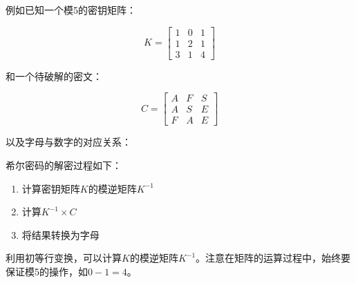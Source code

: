 例如已知一个模5的密钥矩阵：

\[
    K =
    \begin{bmatrix}
        1 & 0 & 1 \\
        1 & 2 & 1 \\
        3 & 1 & 4
    \end{bmatrix}
\]

\vspace{0.5cm}

和一个待破解的密文：

\[
    C =
    \begin{bmatrix}
        A & F & S \\
        A & S & E \\
        F & A & E
    \end{bmatrix}
\]

\vspace{0.5cm}

以及字母与数字的对应关系：\\

\begin{table}[H]
    \centering
\end{table}

希尔密码的解密过程如下：

\begin{enumerate}
    \item 计算密钥矩阵$ K $的模逆矩阵$ K^{-1} $
    \item 计算$ K^{-1} \times C $
    \item 将结果转换为字母
\end{enumerate}

利用初等行变换，可以计算$ K $的模逆矩阵$ K^{-1} $。注意在矩阵的运算过程中，始终要保证模5的操作，如$ 0 - 1 = 4 $。

